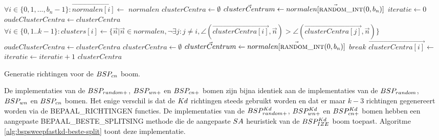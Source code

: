 \begin{dutchalgorithm}
    \begin{algorithmic}       
            \State $\forall i \in \{0,1,...,b_n-1\}: \vec{normalen[i]} \gets $
                \State \Return $normalen$
            \EndIf
            \State $clusterCentra \gets \emptyset$
                \State $\vec{clusterCentrum} \gets \vec{normalen[\Call{random\_int}{0, b_n}]}$
                \State {}
            \EndWhile
            \State $iteratie \gets 0$
            \State $oudeClusterCentra \gets clusterCentra$
                \State $\forall i \in \{0,1..k-1\}: clusters[i] \gets \{\vec{n} | \vec{n} \in normalen, \neg\exists j: j \neq i, \angle(\vec{clusterCentra[i]}, \vec{n}) > \angle(\vec{clusterCentra[j]}, \vec{n})\} $
                \State $oudeClusterCentra \gets clusterCentra$
                        \State $clusterCentra \gets \emptyset$
                            \State $\vec{clusterCentrum} \gets \vec{normalen[\Call{random\_int}{0, b_n}]}$
                            \State {}
                            \State $break$
                        \EndWhile
                    \EndIf
                    \State $\vec{clusterCentra[i]} \gets $ 
                \EndFor
                \State $iteratie \gets iteratie + 1$
            \EndWhile
            \State \Return $clusterCentra$
        \EndFunction
    \end{algorithmic}
    \caption{Generatie richtingen voor de $BSP_{cn}$  boom.}
    \label{alg:bspcluster-richtingen}
\end{dutchalgorithm}

De implementaties van de $BSP_{random+}$, $BSP_{wn+}$ en $BSP_{cn+}$ bomen zijn bijna identiek aan de implementaties van de $BSP_{random}$, $BSP_{wn}$ en $BSP_{cn}$ bomen.
Het enige verschil is dat de $Kd$ richtingen steeds gebruikt worden en dat er maar $k - 3$ richtingen gegenereert worden via de BEPAAL\_RICHTINGEN functies.
De implementaties van de $BSP^{Kd}_{random+}$, $BSP^{Kd}_{wn+}$ en $BSP^{Kd}_{cn+}$ bomen hebben een aangepaste BEPAAL\_BESTE\_SPLITSING methode die de aangepaste $SA$ heuristiek van de $BSP^{Kd}_{IZE}$ boom toepast.
Algoritme \ref{alg:bspsweepfastkd-beste-split} toont deze implementatie.

